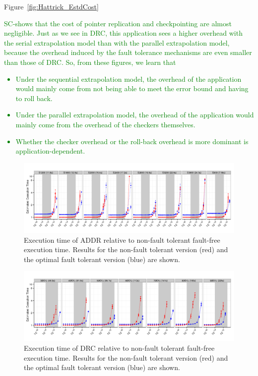 \documentclass{sig-alternate}
\newcommand{\sui}[1]{%
  \textcolor{green}{SC-#1}
}
\begin{document}
Figure~\ref{fig:Hattrick_EstdCost} 
\sui{shows that the cost of pointer replication and checkpointing are almost negligible. Just as we see in DRC, this application sees a higher overhead with the serial extrapolation model than with the parallel extrapolation model, because the overhead induced by the fault tolerance mechanisms are
even smaller than those of DRC.
So, from these figures, we learn that
\begin{itemize}
\item{Under the sequential extrapolation model, the overhead of the application would mainly come from not being able to meet the error bound and having to roll back.}
\item{Under the parallel extrapolation model, the overhead of the application would mainly come from the overhead of the checkers themselves.}
\item{Whether the checker overhead or the roll-back overhead is more dominant is application-dependent.}
\end{itemize}
}

\begin{figure}[ht!]
\centering
\includegraphics[width=7in]{figs/Lasso_Par_Seq_EstdCost_log.png}
\vspace{-10pt}
\caption{Execution time of ADDR relative to non-fault tolerant fault-free execution time. Results for the non-fault tolerant version (red) and the optimal fault tolerant version (blue) are shown.}
\vspace{-10pt}
\label{fig:Lasso_EstdCost}
\end{figure}

\begin{figure}[ht!]
\centering
\includegraphics[width=7in]{figs/DRC_Par_Seq_EstdCost_log.png}
\vspace{-10pt}
\caption{Execution time of DRC relative to non-fault tolerant fault-free execution time. Results for the non-fault tolerant version (red) and the optimal fault tolerant version (blue) are shown.}
\vspace{-10pt}
\label{fig:DRC_EstdCost}
\end{figure}
\end{document}
